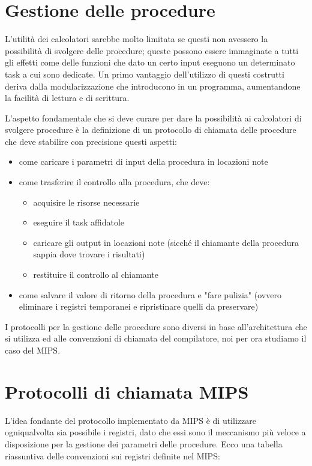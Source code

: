 \documentclass[class=book, crop=false]{standalone}
\begin{document}

\section{Gestione delle procedure}
L'utilità dei calcolatori sarebbe molto limitata se questi non avessero la possibilità di svolgere delle procedure; queste possono essere immaginate a tutti gli effetti come delle funzioni che dato un certo input eseguono un determinato task a cui sono dedicate. Un primo vantaggio dell'utilizzo di questi costrutti deriva dalla modularizzazione che introducono in un programma, aumentandone la facilità di lettura e di scrittura.

L'aspetto fondamentale che si deve curare per dare la possibilità ai calcolatori di svolgere procedure è la definizione di un protocollo di chiamata delle procedure che deve stabilire con precisione questi aspetti:
\begin{itemize}[noitemsep]
	\item come caricare i parametri di input della procedura in locazioni note
	\item come trasferire il controllo alla procedura, che deve:
		\begin{itemize}[nolistsep, noitemsep]
			\item acquisire le risorse necessarie
			\item eseguire il task affidatole
			\item caricare gli output in locazioni note (sicché il chiamante della procedura sappia dove trovare i risultati)
			\item restituire il controllo al chiamante
		\end{itemize}
	\item come salvare il valore di ritorno della procedura e "fare pulizia"  (ovvero eliminare i registri temporanei  e ripristinare quelli da preservare)
\end{itemize}
I protocolli per la gestione delle procedure sono diversi in base all'architettura che si utilizza ed alle convenzioni di chiamata del compilatore, noi per ora studiamo il caso del MIPS.

\section{Protocolli di chiamata MIPS}
L'idea fondante del protocollo implementato da MIPS è di utilizzare ogniqualvolta sia possibile i registri, dato che essi sono il meccanismo più veloce a disposizione per la gestione dei parametri delle procedure. Ecco una tabella riassuntiva delle convenzioni sui registri definite nel MIPS:
\end{document}
